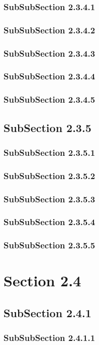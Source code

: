 \subsubsection{SubSubSection 2.3.4.1}
\subsubsection{SubSubSection 2.3.4.2}
\subsubsection{SubSubSection 2.3.4.3}
\subsubsection{SubSubSection 2.3.4.4}
\subsubsection{SubSubSection 2.3.4.5}
\subsection{SubSection 2.3.5}
\subsubsection{SubSubSection 2.3.5.1}
\subsubsection{SubSubSection 2.3.5.2}
\subsubsection{SubSubSection 2.3.5.3}
\subsubsection{SubSubSection 2.3.5.4}
\subsubsection{SubSubSection 2.3.5.5}
\section{Section 2.4}
\subsection{SubSection 2.4.1}
\subsubsection{SubSubSection 2.4.1.1}
